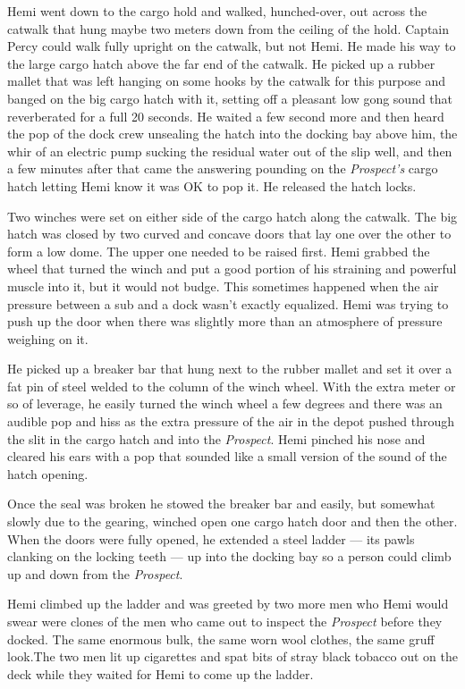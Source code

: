 \documentclass[
]{scrbook}
\begin{document}
Hemi went down to the cargo hold and walked, hunched-over, out across
the catwalk that hung maybe two meters down from the ceiling of the
hold. Captain Percy could walk fully upright on the catwalk, but not
Hemi. He made his way to the large cargo hatch above the far end of the
catwalk. He picked up a rubber mallet that was left hanging on some
hooks by the catwalk for this purpose and banged on the big cargo hatch
with it, setting off a pleasant low gong sound that reverberated for a
full 20 seconds. He waited a few second more and then heard the pop of
the dock crew unsealing the hatch into the docking bay above him, the
whir of an electric pump sucking the residual water out of the slip
well, and then a few minutes after that came the answering pounding on
the \emph{Prospect's} cargo hatch letting Hemi know it was OK to pop it.
He released the hatch locks.

Two winches were set on either side of the cargo hatch along the
catwalk. The big hatch was closed by two curved and concave doors that
lay one over the other to form a low dome. The upper one needed to be
raised first. Hemi grabbed the wheel that turned the winch and put a
good portion of his straining and powerful muscle into it, but it would
not budge. This sometimes happened when the air pressure between a sub
and a dock wasn't exactly equalized. Hemi was trying to push up the door
when there was slightly more than an atmosphere of pressure weighing on
it.

He picked up a breaker bar that hung next to the rubber mallet and set
it over a fat pin of steel welded to the column of the winch wheel. With
the extra meter or so of leverage, he easily turned the winch wheel a
few degrees and there was an audible pop and hiss as the extra pressure
of the air in the depot pushed through the slit in the cargo hatch and
into the \emph{Prospect}. Hemi pinched his nose and cleared his ears
with a pop that sounded like a small version of the sound of the hatch
opening.

Once the seal was broken he stowed the breaker bar and easily, but
somewhat slowly due to the gearing, winched open one cargo hatch door
and then the other. When the doors were fully opened, he extended a
steel ladder --- its pawls clanking on the locking teeth --- up into the
docking bay so a person could climb up and down from the
\emph{Prospect}.

Hemi climbed up the ladder and was greeted by two more men who Hemi
would swear were clones of the men who came out to inspect the
\emph{Prospect} before they docked. The same enormous bulk, the same
worn wool clothes, the same gruff look.The two men lit up cigarettes and
spat bits of stray black tobacco out on the deck while they waited for
Hemi to come up the ladder.
\end{document}
